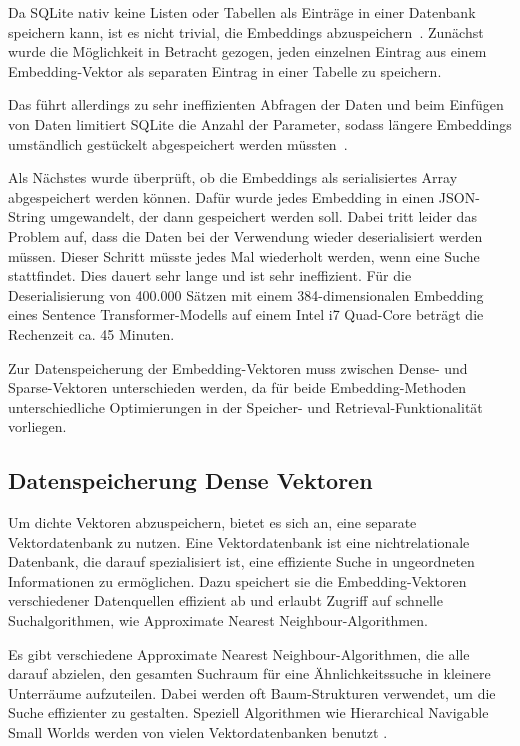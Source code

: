 Da SQLite nativ keine Listen oder Tabellen als Einträge in einer Datenbank speichern kann, ist es nicht trivial, die Embeddings abzuspeichern~\cite{zotero-555}.
Zunächst wurde die Möglichkeit in Betracht gezogen, jeden einzelnen Eintrag aus einem Embedding-Vektor als separaten Eintrag in einer Tabelle zu speichern.

Das führt allerdings zu sehr ineffizienten Abfragen der Daten und beim Einfügen von Daten limitiert SQLite die Anzahl der Parameter, sodass längere Embeddings umständlich gestückelt abgespeichert werden müssten~\cite{zotero-557}.

Als Nächstes wurde überprüft, ob die Embeddings als serialisiertes Array abgespeichert werden können.
Dafür wurde jedes Embedding in einen JSON-String umgewandelt, der dann gespeichert werden soll.
Dabei tritt leider das Problem auf, dass die Daten bei der Verwendung wieder deserialisiert werden müssen.
Dieser Schritt müsste jedes Mal wiederholt werden, wenn eine Suche stattfindet.
Dies dauert sehr lange und ist sehr ineffizient.
Für die Deserialisierung von 400.000 Sätzen mit einem 384-dimensionalen Embedding eines Sentence Transformer-Modells auf einem Intel i7 Quad-Core beträgt die Rechenzeit ca. 45 Minuten.

Zur Datenspeicherung der Embedding-Vektoren muss zwischen Dense- und Sparse-Vektoren unterschieden werden, da für beide Embedding-Methoden unterschiedliche Optimierungen in der Speicher- und Retrieval-Funktionalität vorliegen.

\subsection{Datenspeicherung Dense Vektoren}

Um dichte Vektoren abzuspeichern, bietet es sich an, eine separate Vektordatenbank zu nutzen.
Eine Vektordatenbank ist eine nichtrelationale Datenbank, die darauf spezialisiert ist, eine effiziente Suche in ungeordneten Informationen zu ermöglichen.
Dazu speichert sie die Embedding-Vektoren verschiedener Datenquellen effizient ab und erlaubt Zugriff auf schnelle Suchalgorithmen, wie Approximate Nearest Neighbour-Algorithmen.

Es gibt verschiedene Approximate Nearest Neighbour-Algorithmen, die alle darauf abzielen, den gesamten Suchraum für eine Ähnlichkeitssuche in kleinere Unterräume aufzuteilen.
Dabei werden oft Baum-Strukturen verwendet, um die Suche effizienter zu gestalten.
Speziell Algorithmen wie Hierarchical Navigable Small Worlds werden von vielen Vektordatenbanken benutzt \cite{malkov2020}.

